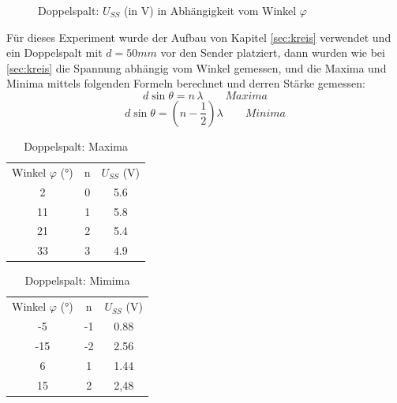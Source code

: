 \documentclass[
  headings=optiontotocandhead,
  twoside,
  openright,
  numbers=noenddot,
  toc=flat,
  11pt,
  parskip=full,
  listof=flat,
  bibliography=totoc,
  a4paper,
  DIV=14,
  BCOR=22mm,
  headheight=5mm,
  headinclude=true,
]{scrartcl}
\begin{document}
\begin{figure}[H]
  \centering
  \caption{Doppelspalt: $U_{SS}$ (in V) in Abhängigkeit vom Winkel $\varphi$}
  \label{fig:doppelspalt_polar}
\end{figure}

Für dieses Experiment wurde der Aufbau von Kapitel \ref{sec:kreis} verwendet und ein Doppelspalt mit $d=50mm$ vor den Sender platziert, dann wurden wie bei \ref{sec:kreis} die Spannung abhängig vom Winkel gemessen, und die Maxima und Minima mittels folgenden Formeln berechnet und derren Stärke gemessen:
$$ d \sin{\theta} = n \, \lambda \qquad \textit{Maxima}$$ 
$$ d \sin{\theta} = \left (n- \frac{1}{2} \right) \lambda \qquad \textit{Minima}$$ 

\begin{table}[H]
  \centering
  \setlength{\tabcolsep}{10pt}
  \begin{tabular}{ |c|c|c| }
    \multicolumn{1}{c}{Winkel $\varphi$ (°)} & \multicolumn{1}{c}{n} & \multicolumn{1}{c}{$U_{SS}$ (V)} \\
    2 & 0 & 5.6 \\
    11 & 1 & 5.8 \\
    21 & 2 & 5.4 \\
    33 & 3 & 4.9 \\
  \end{tabular}
  \caption{Doppelspalt: Maxima}
  \label{tab:doppelspaltmax}
\end{table}

\begin{table}[H]
  \centering
  \setlength{\tabcolsep}{10pt}
  \begin{tabular}{ |c|c|c| }
    \multicolumn{1}{c}{Winkel $\varphi$ (°)} & \multicolumn{1}{c}{n} & \multicolumn{1}{c}{$U_{SS}$ (V)} \\
    -5 & -1 & 0.88 \\
    -15 & -2 & 2.56 \\
    6 & 1 & 1.44 \\
    15 & 2 & 2,48 \\
  \end{tabular}
  \caption{Doppelspalt: Mimima}
  \label{tab:doppelspaltmin}
\end{table}
\end{document}
